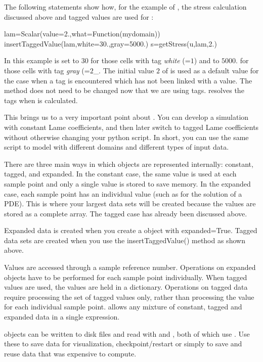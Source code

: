The following statements show how, for the
example of , the stress calculation discussed above and tagged values are used for
:
\begin{python}
  lam=Scalar(value=2.,what=Function(mydomain))
  insertTaggedValue(lam,white=30.,gray=5000.)
  s=getStress(u,lam,2.)
\end{python}
In this example  is set to $30$ for those cells with tag {\it white} (=$1$) and to $5000.$ for those cells 
with tag {\it gray} (=$2$_. The initial value $2$ of  is used as a default value for the case when a tag
is encountered which has not been linked with a value. The  method
does not need to be changed now that we are using tags.
\escript resolves the tags when  is calculated.

This brings us to a very important point about \escript.
You can develop a simulation with constant Lame coefficients, and then later switch to tagged
Lame coefficients without otherwise changing your python script.
In short, you can use the same script to model with different domains and different types of input data.

There are three main ways in which \Data objects are represented internally: constant, tagged, and expanded.
In the constant case, the same value is used at each sample point and only a single value is stored to save memory. 
In the expanded case, each sample point has an individual value (such as for the solution of a PDE).
This is where your largest data sets will be created because the values are stored as a complete array.
The tagged case has already been discussed above.

Expanded data is created when you create a \Data object with expanded=True.
Tagged data sets are created when you use the insertTaggedValue() method as shown above.
 
Values are accessed through a sample reference number. Operations on expanded \Data
objects have to be performed for each sample point individually. When tagged values are used, the values are
held in a dictionary. Operations on tagged data require processing the set of tagged values only, rather than 
processing the value for each individual sample point. 
\escript allows any mixture of constant, tagged and expanded data in a single expression.

\Data objects can be written to disk files and read with  and , both of which use \netCDF\cite{NETCDF}.
Use these to save data for visualization, checkpoint/restart or simply to save and reuse data that was expensive to compute.

